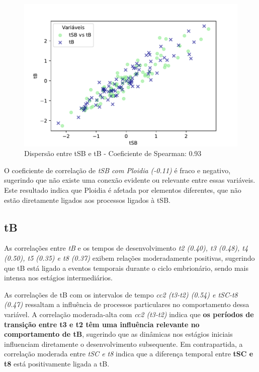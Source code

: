 \begin{figure}[h]
    \captionsetup{font=footnotesize, justification=centering, labelsep=period, position=above}
    \label{fig:tSB-tB}
    \centering
    \includegraphics[scale=0.40]{figuras/Spearman/tSB-tB.pdf}
    \caption{Dispersão entre tSB e tB - Coeficiente de Spearman: 0.93}
    \vspace{0.3cm} 
    \begin{minipage}{\linewidth}
        \centering
    \end{minipage}
\end{figure}
\FloatBarrier

O coeficiente de correlação de \textit{tSB com Ploidia (-0.11)} é fraco e negativo, sugerindo que não existe uma conexão evidente ou relevante entre essas variáveis. Este resultado indica que Ploidia é afetada por elementos diferentes, que não estão diretamente ligados aos processos ligados à tSB.

\subsection*{tB}
As correlações entre \textit{tB} e os tempos de desenvolvimento \textit{t2 (0.40), t3 (0.48), t4 (0.50), t5 (0.35) e t8 (0.37)} exibem relações moderadamente positivas, sugerindo que tB está ligado a eventos temporais durante o ciclo embrionário, sendo mais intensa nos estágios intermediários. 

As correlações de tB com os intervalos de tempo \textit{cc2 (t3-t2) (0.54) e tSC-t8 (0.47)} ressaltam a influência de processos particulares no comportamento dessa variável. A correlação moderada-alta com \textit{cc2 (t3-t2)} indica que \textbf{os períodos de transição entre t3 e t2 têm uma influência relevante no comportamento de tB}, sugerindo que as dinâmicas nos estágios iniciais influenciam diretamente o desenvolvimento subsequente. Em contrapartida, a correlação moderada entre \textit{tSC e t8} indica que a diferença temporal entre \textbf{tSC e t8} está positivamente ligada a tB. 

